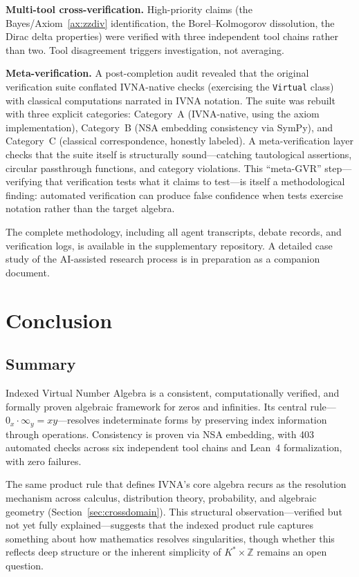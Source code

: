 \documentclass[12pt]{article}
\theoremstyle{definition}
\theoremstyle{remark}
\newcommand{\vz}[1]{0_{#1}}             %
\newcommand{\vi}[1]{\infty_{#1}}        %
\begin{document}
\textbf{Multi-tool cross-verification.} High-priority claims (the
Bayes/Axiom~\ref{ax:zzdiv} identification, the Borel--Kolmogorov
dissolution, the Dirac delta properties) were verified with three
independent tool chains rather than two. Tool disagreement triggers
investigation, not averaging.

\textbf{Meta-verification.} A post-completion audit revealed that the
original verification suite conflated IVNA-native checks (exercising the
\texttt{Virtual} class) with classical computations narrated in IVNA
notation. The suite was rebuilt with three explicit categories:
Category~A (IVNA-native, using the axiom implementation), Category~B
(NSA embedding consistency via SymPy), and Category~C (classical
correspondence, honestly labeled). A meta-verification layer checks
that the suite itself is structurally sound---catching tautological
assertions, circular passthrough functions, and category violations.
This ``meta-GVR'' step---verifying that verification tests what it
claims to test---is itself a methodological finding: automated
verification can produce false confidence when tests exercise notation
rather than the target algebra.

The complete methodology, including all agent transcripts, debate
records, and verification logs, is available in the supplementary
repository. A detailed case study of the AI-assisted research
process is in preparation as a companion document.


\section{Conclusion}
\label{sec:conclusion}

\subsection{Summary}

Indexed Virtual Number Algebra is a consistent, computationally verified,
and formally proven algebraic framework for zeros and infinities. Its
central rule---$\vz{x} \cdot \vi{y} = xy$---resolves indeterminate forms
by preserving index information through operations. Consistency is proven
via NSA embedding, with 403 automated checks across six independent
tool chains and Lean~4 formalization, with zero failures.

The same product rule that defines IVNA's core algebra recurs as the
resolution mechanism across calculus, distribution theory, probability,
and algebraic geometry (Section~\ref{sec:crossdomain}). This structural
observation---verified but not yet fully explained---suggests that the
indexed product rule captures something about how mathematics resolves
singularities, though whether this reflects deep structure or the
inherent simplicity of $K^* \times \mathbb{Z}$ remains an open
question.
\end{document}
